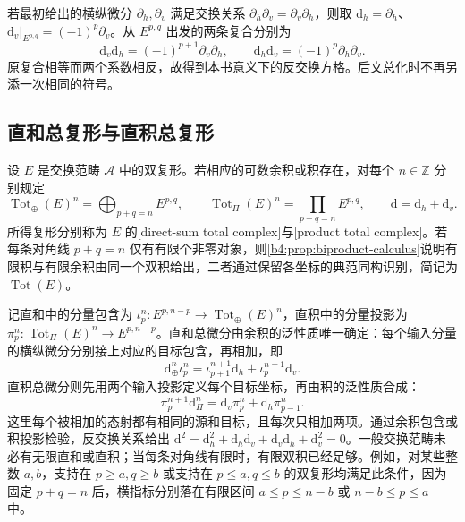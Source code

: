 \ProseParagraphBreak
若最初给出的横纵微分 \(\partial_h,\partial_v\) 满足交换关系 \(\partial_h\partial_v=\partial_v\partial_h\)，则取 \(\mathrm{d}_h=\partial_h\)、\(\mathrm{d}_v|_{E^{p,q}}=(-1)^p\partial_v\)。从 \(E^{p,q}\) 出发的两条复合分别为
\[
	\mathrm{d}_v\mathrm{d}_h=(-1)^{p+1}\partial_v\partial_h, \qquad \mathrm{d}_h\mathrm{d}_v=(-1)^p\partial_h\partial_v.
\]
原复合相等而两个系数相反，故得到本书意义下的反交换方格。后文总化时不再另添一次相同的符号。

\subsection{直和总复形与直积总复形}
\label{b4:subsec:0604:02}

\begin{definition}\label{b4:def:total-complex}
	设 \(E\) 是交换范畴 \(\mathcal A\) 中的双复形。若相应的可数余积或积存在，对每个 \(n\in\mathbb Z\) 分别规定
	\[
		\operatorname{Tot}_{\oplus}(E)^n=\bigoplus_{p+q=n}E^{p,q},\qquad \operatorname{Tot}_{\Pi}(E)^n=\prod_{p+q=n}E^{p,q}, \qquad \mathrm{d}=\mathrm{d}_h+\mathrm{d}_v.
	\]
	所得复形分别称为 \(E\) 的[direct-sum total complex]与[product total complex]。若每条对角线 \(p+q=n\) 仅有有限个非零对象，则\cref{b4:prop:biproduct-calculus}说明有限积与有限余积由同一个双积给出，二者通过保留各坐标的典范同构识别，简记为 \(\operatorname{Tot}(E)\)。
\end{definition}

记直和中的分量包含为 \(\iota_p^n:E^{p,n-p}\to\operatorname{Tot}_{\oplus}(E)^n\)，直积中的分量投影为 \(\pi_p^n:\operatorname{Tot}_{\Pi}(E)^n\to E^{p,n-p}\)。直和总微分由余积的泛性质唯一确定：每个输入分量的横纵微分分别接上对应的目标包含，再相加，即
\[
	\mathrm{d}_{\oplus}^n\iota_p^n =\iota_{p+1}^{n+1}\mathrm{d}_h+\iota_p^{n+1}\mathrm{d}_v.
\]
直积总微分则先用两个输入投影定义每个目标坐标，再由积的泛性质合成：
\[
	\pi_p^{n+1}\mathrm{d}_{\Pi}^n =\mathrm{d}_v\pi_p^n+\mathrm{d}_h\pi_{p-1}^n.
\]
这里每个被相加的态射都有相同的源和目标，且每次只相加两项。通过余积包含或积投影检验，反交换关系给出 \(\mathrm{d}^2=\mathrm{d}_h^2+\mathrm{d}_h\mathrm{d}_v+\mathrm{d}_v\mathrm{d}_h+\mathrm{d}_v^2=0\)。一般交换范畴未必有无限直和或直积；当每条对角线有限时，有限双积已经足够。例如，对某些整数 \(a,b\)，支持在 \(p\ge a,q\ge b\) 或支持在 \(p\le a,q\le b\) 的双复形均满足此条件，因为固定 \(p+q=n\) 后，横指标分别落在有限区间 \(a\le p\le n-b\) 或 \(n-b\le p\le a\) 中。

